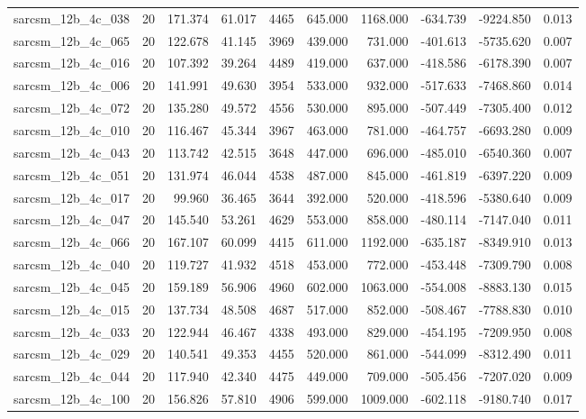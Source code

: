 \begin{tabular}{lrrrrrrrrr}
sarcsm\_12b\_4c\_038 & 20 & 171.374 & 61.017 & 4465 & 645.000 & 1168.000 & -634.739 & -9224.850 & 0.013 \\
sarcsm\_12b\_4c\_065 & 20 & 122.678 & 41.145 & 3969 & 439.000 & 731.000 & -401.613 & -5735.620 & 0.007 \\
sarcsm\_12b\_4c\_016 & 20 & 107.392 & 39.264 & 4489 & 419.000 & 637.000 & -418.586 & -6178.390 & 0.007 \\
sarcsm\_12b\_4c\_006 & 20 & 141.991 & 49.630 & 3954 & 533.000 & 932.000 & -517.633 & -7468.860 & 0.014 \\
sarcsm\_12b\_4c\_072 & 20 & 135.280 & 49.572 & 4556 & 530.000 & 895.000 & -507.449 & -7305.400 & 0.012 \\
sarcsm\_12b\_4c\_010 & 20 & 116.467 & 45.344 & 3967 & 463.000 & 781.000 & -464.757 & -6693.280 & 0.009 \\
sarcsm\_12b\_4c\_043 & 20 & 113.742 & 42.515 & 3648 & 447.000 & 696.000 & -485.010 & -6540.360 & 0.007 \\
sarcsm\_12b\_4c\_051 & 20 & 131.974 & 46.044 & 4538 & 487.000 & 845.000 & -461.819 & -6397.220 & 0.009 \\
sarcsm\_12b\_4c\_017 & 20 & 99.960 & 36.465 & 3644 & 392.000 & 520.000 & -418.596 & -5380.640 & 0.009 \\
sarcsm\_12b\_4c\_047 & 20 & 145.540 & 53.261 & 4629 & 553.000 & 858.000 & -480.114 & -7147.040 & 0.011 \\
sarcsm\_12b\_4c\_066 & 20 & 167.107 & 60.099 & 4415 & 611.000 & 1192.000 & -635.187 & -8349.910 & 0.013 \\
sarcsm\_12b\_4c\_040 & 20 & 119.727 & 41.932 & 4518 & 453.000 & 772.000 & -453.448 & -7309.790 & 0.008 \\
sarcsm\_12b\_4c\_045 & 20 & 159.189 & 56.906 & 4960 & 602.000 & 1063.000 & -554.008 & -8883.130 & 0.015 \\
sarcsm\_12b\_4c\_015 & 20 & 137.734 & 48.508 & 4687 & 517.000 & 852.000 & -508.467 & -7788.830 & 0.010 \\
sarcsm\_12b\_4c\_033 & 20 & 122.944 & 46.467 & 4338 & 493.000 & 829.000 & -454.195 & -7209.950 & 0.008 \\
sarcsm\_12b\_4c\_029 & 20 & 140.541 & 49.353 & 4455 & 520.000 & 861.000 & -544.099 & -8312.490 & 0.011 \\
sarcsm\_12b\_4c\_044 & 20 & 117.940 & 42.340 & 4475 & 449.000 & 709.000 & -505.456 & -7207.020 & 0.009 \\
sarcsm\_12b\_4c\_100 & 20 & 156.826 & 57.810 & 4906 & 599.000 & 1009.000 & -602.118 & -9180.740 & 0.017 \\

\end{tabular}
